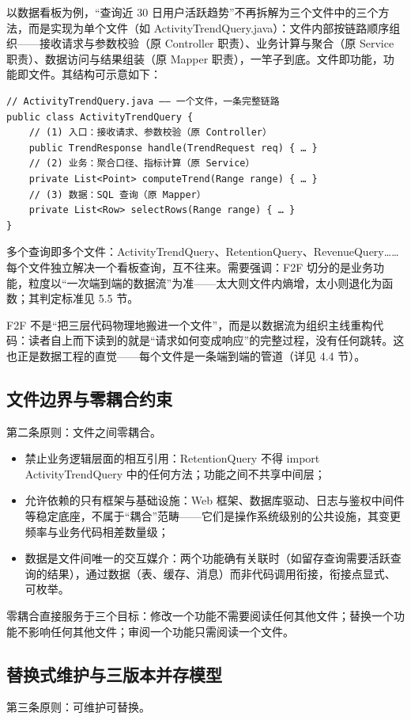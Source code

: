 \documentclass[11pt,a4paper]{ctexart}
\begin{document}
以数据看板为例，“查询近 30 日用户活跃趋势”不再拆解为三个文件中的三个方法，而是实现为单个文件（如 ActivityTrendQuery.java）：文件内部按链路顺序组织——接收请求与参数校验（原 Controller 职责）、业务计算与聚合（原 Service 职责）、数据访问与结果组装（原 Mapper 职责），一竿子到底。文件即功能，功能即文件。其结构可示意如下：

\begin{verbatim}
// ActivityTrendQuery.java —— 一个文件，一条完整链路
public class ActivityTrendQuery {
    // (1) 入口：接收请求、参数校验（原 Controller）
    public TrendResponse handle(TrendRequest req) { … }
    // (2) 业务：聚合口径、指标计算（原 Service）
    private List<Point> computeTrend(Range range) { … }
    // (3) 数据：SQL 查询（原 Mapper）
    private List<Row> selectRows(Range range) { … }
}
\end{verbatim}

多个查询即多个文件：ActivityTrendQuery、RetentionQuery、RevenueQuery……每个文件独立解决一个看板查询，互不往来。需要强调：F2F 切分的是业务功能，粒度以“一次端到端的数据流”为准——太大则文件内熵增，太小则退化为函数；其判定标准见 5.5 节。

F2F 不是“把三层代码物理地搬进一个文件”，而是以数据流为组织主线重构代码：读者自上而下读到的就是“请求如何变成响应”的完整过程，没有任何跳转。这也正是数据工程的直觉——每个文件是一条端到端的管道（详见 4.4 节）。

\subsection{文件边界与零耦合约束}
第二条原则：文件之间零耦合。

\begin{itemize}
\item 禁止业务逻辑层面的相互引用：RetentionQuery 不得 import ActivityTrendQuery 中的任何方法；功能之间不共享中间层；
\item 允许依赖的只有框架与基础设施：Web 框架、数据库驱动、日志与鉴权中间件等稳定底座，不属于“耦合”范畴——它们是操作系统级别的公共设施，其变更频率与业务代码相差数量级；
\item 数据是文件间唯一的交互媒介：两个功能确有关联时（如留存查询需要活跃查询的结果），通过数据（表、缓存、消息）而非代码调用衔接，衔接点显式、可枚举。
\end{itemize}

零耦合直接服务于三个目标：修改一个功能不需要阅读任何其他文件；替换一个功能不影响任何其他文件；审阅一个功能只需阅读一个文件。

\subsection{替换式维护与三版本并存模型}
第三条原则：可维护可替换。
\end{document}
